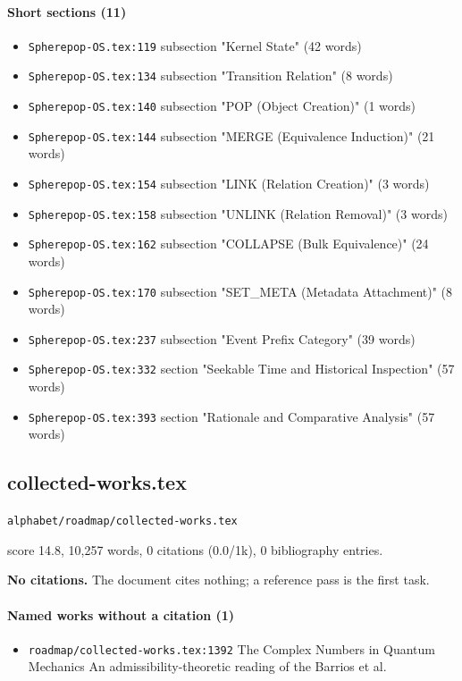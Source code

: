 \documentclass[11pt]{article}
\newcommand{\loc}[1]{{\small\color{muted}\texttt{#1}}}
\begin{document}
\paragraph{Short sections (11)}
\begin{itemize}
\item \loc{Spherepop-OS.tex:119} subsection "Kernel State" (42 words)
\item \loc{Spherepop-OS.tex:134} subsection "Transition Relation" (8 words)
\item \loc{Spherepop-OS.tex:140} subsection "POP (Object Creation)" (1 words)
\item \loc{Spherepop-OS.tex:144} subsection "MERGE (Equivalence Induction)" (21 words)
\item \loc{Spherepop-OS.tex:154} subsection "LINK (Relation Creation)" (3 words)
\item \loc{Spherepop-OS.tex:158} subsection "UNLINK (Relation Removal)" (3 words)
\item \loc{Spherepop-OS.tex:162} subsection "COLLAPSE (Bulk Equivalence)" (24 words)
\item \loc{Spherepop-OS.tex:170} subsection "SET\_META (Metadata Attachment)" (8 words)
\item \loc{Spherepop-OS.tex:237} subsection "Event Prefix Category" (39 words)
\item \loc{Spherepop-OS.tex:332} section "Seekable Time and Historical Inspection" (57 words)
\item \loc{Spherepop-OS.tex:393} section "Rationale and Comparative Analysis" (57 words)
\end{itemize}
\subsection{collected-works.tex}
\loc{alphabet/\allowbreak{}roadmap/\allowbreak{}collected-works.tex}\par
score 14.8, 10,257 words, 0 citations (0.0/1k), 0 bibliography entries.

\textbf{No citations.} The document cites nothing; a reference pass is the first task.

\paragraph{Named works without a citation (1)}
\begin{itemize}
\item \loc{roadmap/\allowbreak{}collected-works.tex:1392} The Complex Numbers in Quantum Mechanics An admissibility-theoretic reading of the Barrios et al.
\end{itemize}
\end{document}
